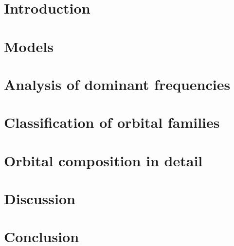 \documentclass[draft]{trlnotes}
\begin{document}
\begin{otherlanguage}{english}
\chapter*{Introduction}
% 

\chapter{Models}
\label{chap:model}
% 

\chapter{Analysis of dominant frequencies}
\label{chap:method}
% 

\chapter{Classification of orbital families}
\label{chap:split}
% 

\chapter{Orbital composition in detail}
\label{chap:orbits}
% 

\chapter{Discussion}
\label{chap:discuss}
% 

\chapter*{Conclusion}
\label{chap:conc}
% 
\clearpage

\appendix

\printbibliography[
  heading=bibintoc,
  title={References}
]
\end{otherlanguage}
\end{document}
